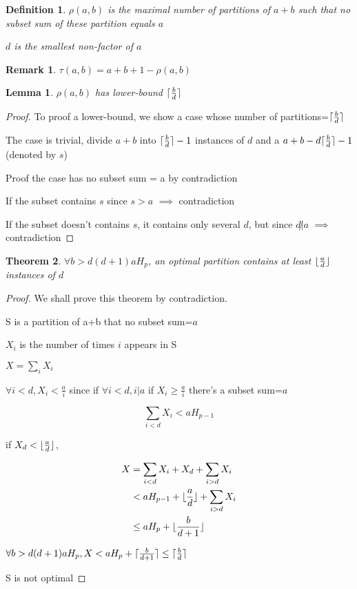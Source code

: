 \documentclass[12pt,a4paper]{article}
\title{}
\author{}
\DeclarePairedDelimiter\ceil{\lceil}{\rceil}
\DeclarePairedDelimiter\floor{\lfloor}{\rfloor}
\newtheorem{theorem}{Theorem}[section]
\newtheorem{lemma}[theorem]{Lemma}
\newtheorem{definition}{Definition}
\newtheorem*{remark}{Remark}
\begin{document}
\begin{definition}
$\rho(a,b)$ is the maximal number of partitions of $a+b$ such that no subset sum of these partition equals $a$

$d$ is the smallest non-factor of $a$
\end{definition}

\begin{remark}
$\tau(a,b)=a+b+1-\rho(a,b)$
\end{remark}

\begin{lemma}
$\rho(a,b)$ has lower-bound $\ceil{\frac{b}{d}}$
\end{lemma} 

\begin{proof}
To proof a lower-bound, we show a case whose number of partitions=$\ceil{\frac{b}{d}}$

The case is trivial, divide $a+b$ into $\ceil{\frac{b}{d}}-1$ instances of $d$ and a $a+b-d\ceil{\frac{b}{d}}-1$ (denoted by $s$)

Proof the case has no subset sum = a by contradiction

If the subset contains $s$ since $s>a$ $\implies$ contradiction

If the subset doesn't contains $s$, it contains only several $d$, but since $d\not| a$ $\implies$ contradiction
\end{proof}

\begin{theorem}
	$\forall b>d(d+1)aH_p$, an optimal partition contains at least $\floor{\frac{a}{d}}$ instances of $d$
\end{theorem}


\begin{proof}
    We shall prove this theorem by contradiction.  

    S is a partition of a+b that no subset sum=$a$

    $X_i$ is the number of times $i$ appears in S

    $X = \sum_i{X_i}$

    $\forall i<d, X_i<\frac{a}{i}$ since if $\forall i<d, i|a$ if $X_i\geq \frac{a}{i}$ there's a subset sum=$a$

    \begin{equation}
        \sum_{i<d}{X_i}<aH_{p-1}
    \end{equation}

    if $X_d<\floor{\frac{a}{d}}$,

    \begin{align*}
        X&=\sum_{i<d}{X_i}+X_d+\sum_{i>d}{X_i}\\
         &<aH_{p-1}+\floor{\frac{a}{d}}+\sum_{i>d}{X_i}\\
         &\leq aH_p+\floor{\frac{b}{d+1}}
    \end{align*}

    $\forall b>d(d+1)aH_p, X<aH_p+\ceil{\frac{b}{d+1}}\leq \ceil{\frac{b}{d}}$

    S is not optimal
\end{proof}
\end{document}
